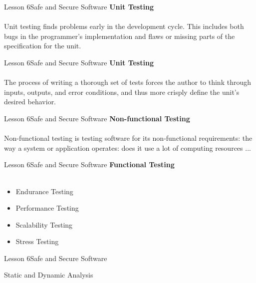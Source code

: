 \documentclass[aspectratio=1610]{beamer}
\begin{document}
\begin{frame}{Lesson 6}{Safe and Secure Software}
\LARGE
\textbf{Unit Testing}\\~\\ 
Unit testing finds problems early in the development cycle. This includes both bugs in 
the programmer's implementation and flaws or missing parts of the specification for the 
unit.
\end{frame}

\begin{frame}{Lesson 6}{Safe and Secure Software}
\LARGE
\textbf{Unit Testing}\\~\\ 
The process of writing a thorough set of tests forces the author to think through 
inputs, outputs, and error conditions, and thus more crisply define the unit's desired 
behavior.
\end{frame}

\begin{frame}{Lesson 6}{Safe and Secure Software}
\LARGE
\textbf{Non-functional Testing}\\~\\ 
Non-functional testing is testing software for its non-functional requirements: the way 
a system or application operates: does it use a lot of computing resources ... 
\end{frame}


\begin{frame}{Lesson 6}{Safe and Secure Software}
\LARGE
\textbf{Functional Testing}\\~\\ 
\begin{itemize}
    \item Endurance Testing
    \item Performance Testing
    \item Scalability Testing
    \item Stress Testing
\end{itemize}
\end{frame}




\begin{frame}{Lesson 6}{Safe and Secure Software}
\Huge
\begin{center}
Static and Dynamic Analysis
\end{center}
\end{frame}
\end{document}
